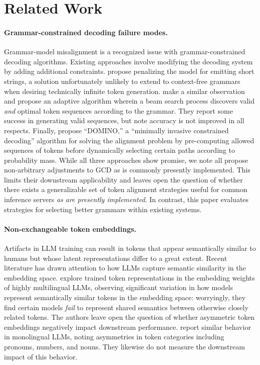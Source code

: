 \section{Related Work}
\paragraph{Grammar-constrained decoding failure modes.}
Grammar-model misalignment is a recognized issue with grammar-constrained decoding algorithms.
Existing approaches involve modifying the decoding system by adding additional constraints.
\citet{Geng_Josifoski_Peyrard_West_2023} propose penalizing the model for emitting short strings, a solution unfortunately unlikely to extend to context-free grammars when desiring technically infinite token generation.
\citet{Park_Wang_Berg_2024} make a similar observation and propose an adaptive algorithm wherein a beam search process discovers valid \emph{and} optimal token sequences according to the grammar.
They report some success in generating valid sequences, but note accuracy is not improved in all respects.
Finally, \citet{Beurer-Kellner_Fischer_Vechev_2024} propose ``DOMINO,'' a ``minimally invasive constrained decoding'' algorithm for solving the alignment problem by pre-computing allowed sequences of tokens before dynamically selecting certain paths according to probability mass.
While all three approaches show promise, we note all propose non-arbitrary adjustments to GCD as is commonly presently implemented.
This limits their downstream applicability and leaves open the question of whether there exists a generalizable set of token alignment strategies useful for common inference servers \emph{as are presently implemented}.
In contrast, this paper evaluates strategies for selecting better grammars within existing systems.

\paragraph{Non-exchangeable token embeddings.}
Artifacts in LLM training can result in tokens that appear semantically similar to humans but whose latent representations differ to a great extent.
Recent literature has drawn attention to how LLMs capture semantic similarity in the embedding space.
\citet{Wen-Yi_Mimno_2023} explore trained token representations in the embedding weights of highly multilingual LLMs, observing significant variation in how models represent semantically similar tokens in the embedding space: worryingly, they find certain models \emph{fail} to represent shared semantics between otherwise closely related tokens.
The authors leave open the question of whether asymmetric token embeddings negatively impact downstream performance.
\citet{Zhang_Lu_Tran_Schuster_Metzler_Lin_2024} report similar behavior in  monolingual LLMs, noting asymmetries in token categories including pronouns, numbers, and nouns.
They likewise do not measure the downstream impact of this behavior.

